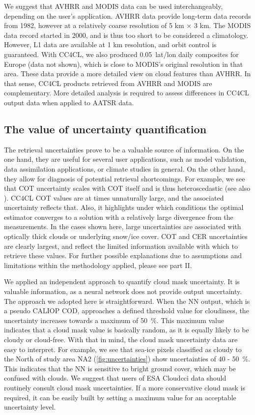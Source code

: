 We suggest that AVHRR and MODIS data can be used interchangeably, depending on the user's application. AVHRR data provide long-term data records from 1982, however at a relatively coarse resolution of 5 km $\times$ 3 km. The MODIS data record started in 2000, and is thus too short to be considered a climatology. However, L1 data are available at 1 km resolution, and orbit control is guaranteed. With CC4CL, we also produced 0.05\textdegree\ lat/lon daily composites for Europe (data not shown), which is close to MODIS's original resolution in that area. These data provide a more detailed view on cloud features than AVHRR. In that sense, CC4CL products retrieved from AVHRR and MODIS are complementary. More detailed analysis is required to assess differences in CC4CL output data when applied to AATSR data.

\subsection{The value of uncertainty quantification}

The retrieval uncertainties prove to be a valuable source of information. On the one hand, they are useful for several user applications, such as model validation, data assimilation applications, or climate studies in general. On the other hand, they allow for diagnosis of potential retrieval shortcomings. For example, we see that COT uncertainty scales with COT itself and is thus heteroscedastic (see also \citet{Poulsen12}). CC4CL COT values are at times unnaturally large, and the associated uncertainty reflects that. Also, it highlights under which conditions the optimal estimator converges to a solution with a relatively large divergence from the measurements. In the cases shown here, large uncertainties are associated with optically thick clouds or underlying snow/ice cover. COT and CER uncertainties are clearly largest, and reflect the limited information available with which to retrieve these values. For further possible explanations due to assumptions and limitations within the methodology applied, please see part II.

We applied an independent approach to quantify cloud mask uncertainty. It is valuable information, as a neural network does not provide output uncertainty. The approach we adopted here is straightforward. When the NN output, which is a pseudo CALIOP COD, approaches a defined threshold value for cloudiness, the uncertainty increases towards a maximum of 50~\%. This maximum value indicates that a cloud mask value is basically random, as it is equally likely to be cloudy or cloud-free. With that in mind, the cloud mask uncertainty data are easy to interpret. For example, we see that sea-ice pixels classified as cloudy to the North of study area NA2 (\cref{fig:uncertainties}) show uncertainties of 40 - 50~\%. This indicates that the NN is sensitive to bright ground cover, which may be confused with clouds. We suggest that users of ESA Cloud\textunderscore cci data should routinely consult cloud mask uncertainties. If a more conservative cloud mask is required, it can be easily built by setting a maximum value for an acceptable uncertainty level.


